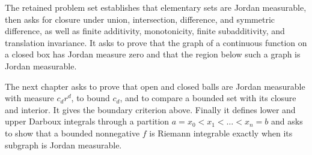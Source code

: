 The retained problem set establishes that elementary sets are Jordan measurable, then asks for closure under union, intersection, difference, and symmetric difference, as well as finite additivity, monotonicity, finite subadditivity, and translation invariance. It asks to prove that the graph of a continuous function on a closed box has Jordan measure zero and that the region below such a graph is Jordan measurable.

The next chapter asks to prove that open and closed balls are Jordan measurable with measure \(c_{d}r^{d}\), to bound \(c_{d}\), and to compare a bounded set with its closure and interior. It gives the boundary criterion above. Finally it defines lower and upper Darboux integrals through a partition \(a = x_{0} < x_{1} < \ldots < x_{n} = b\) and asks to show that a bounded nonnegative \(f\) is Riemann integrable exactly when its subgraph is Jordan measurable.
